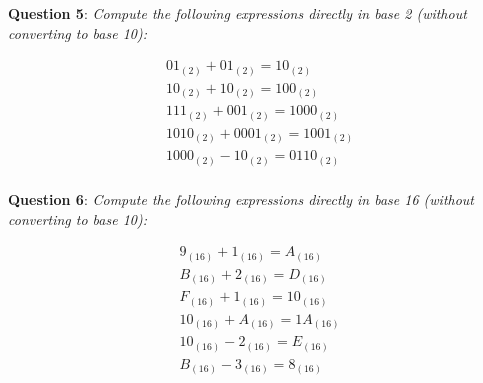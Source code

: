 \documentclass{article}
\newcommand{\question}[2][]{\begin{flushleft}
        \textbf{Question #1}: \textit{#2}


\end{flushleft}}
\begin{document}
	\question[5]{Compute the following expressions directly in base 2 (without converting to base 10):}

	\begin{gather*}
		01_{(2)} + 01_{(2)} = 10_{(2)}\\
		10_{(2)} + 10_{(2)} = 100_{(2)}\\
		111_{(2)} + 001_{(2)} = 1000_{(2)}\\
		1010_{(2)} + 0001_{(2)} =  1001_{(2)}\\
		1000_{(2)} - 10_{(2)} = 0110_{(2)}\\
	\end{gather*}	

	\question[6]{Compute the following expressions directly in base 16 (without converting to base 10):}

	\begin{gather*}
		9_{(16)} + 1_{(16)} = A_{(16)}\\
		B_{(16)} + 2_{(16)} = D_{(16)}\\
		F_{(16)} + 1_{(16)} = 10_{(16)}\\
		10_{(16)} + A_{(16)} = 1A_{(16)}\\
		10_{(16)} - 2_{(16)} = E_{(16)}\\
		B_{(16)} - 3_{(16)} = 8_{(16)}\\
	\end{gather*}	
\end{document}
